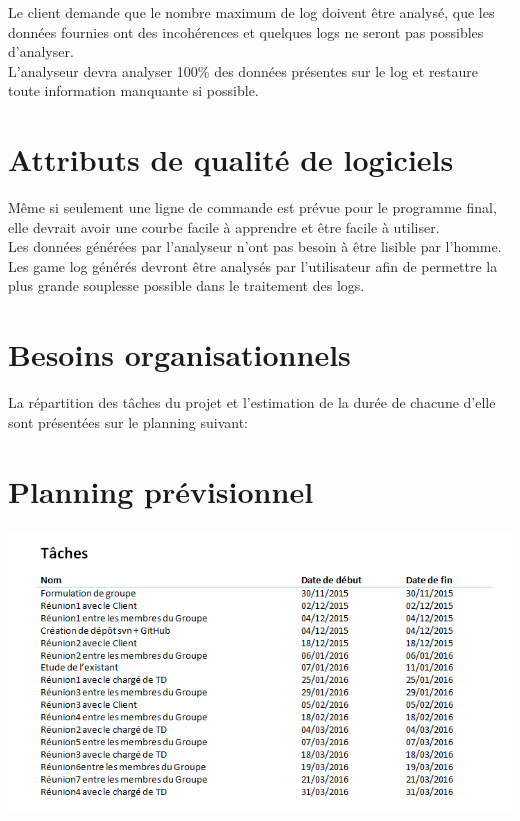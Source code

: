 \documentclass{scrreprt}
\begin{document}
Le client demande que le nombre maximum de log doivent être analysé, que les données fournies ont des incohérences et quelques logs ne seront pas possibles d'analyser.\\
L'analyseur devra analyser 100\% des données présentes sur le log et restaure toute information manquante si possible.\\
\section{Attributs de qualité de logiciels}

Même si seulement une ligne de commande est prévue pour le programme final, elle devrait avoir une courbe facile à apprendre et être facile à utiliser.\\
Les données générées par l'analyseur n’ont pas besoin à être lisible par l'homme.\\
Les game log générés devront être analysés par l'utilisateur afin de permettre la plus grande souplesse possible dans le traitement des logs.

\section{Besoins organisationnels}

La répartition des tâches du projet et l'estimation de la durée de chacune d'elle sont présentées sur le planning suivant:\\

\section{Planning prévisionnel}

\includegraphics[scale=0.45,keepaspectratio]{planning}\\
\end{document}
